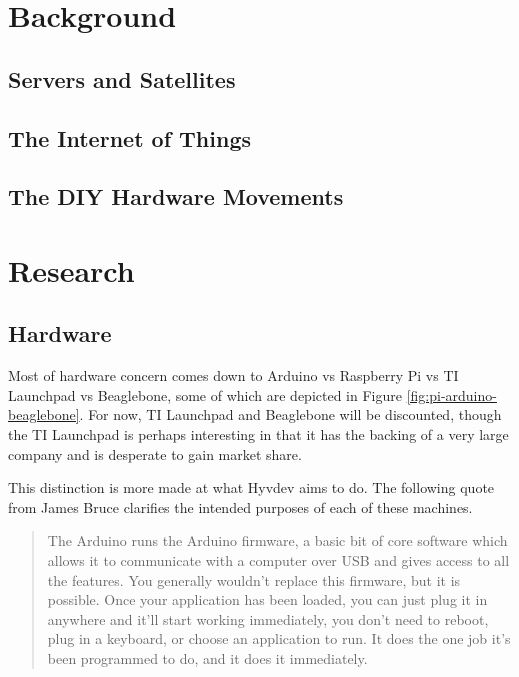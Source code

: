 \begin{multicols}{2}		

\section{Background}

	\subsection{Servers and Satellites}
	
	\subsection{The Internet of Things}
	
	\subsection{The DIY Hardware Movements}

\section{Research}

	\subsection{Hardware}
	
		Most of hardware concern comes down to Arduino vs Raspberry Pi vs TI Launchpad vs Beaglebone, some of which are depicted in Figure \ref{fig:pi-arduino-beaglebone}. 
		For now, TI Launchpad and Beaglebone will be discounted, though the TI Launchpad is perhaps interesting in that it has the backing of a very large company and is desperate to gain market share.
		
		This distinction is more made at what Hyvdev aims to do.
		The following quote from James Bruce clarifies the intended purposes of each of these machines.
		
		\begin{quote}
			The Arduino runs the Arduino firmware, a basic bit of core software which allows it to communicate with a computer over USB and gives access to all the features. You generally wouldn't replace this firmware, but it is possible. Once your application has been loaded, you can just plug it in anywhere and it'll start working immediately, you don't need to reboot, plug in a keyboard, or choose an application to run. It does the one job it's been programmed to do, and it does it immediately.
			

\end{quote}
\end{multicols}

